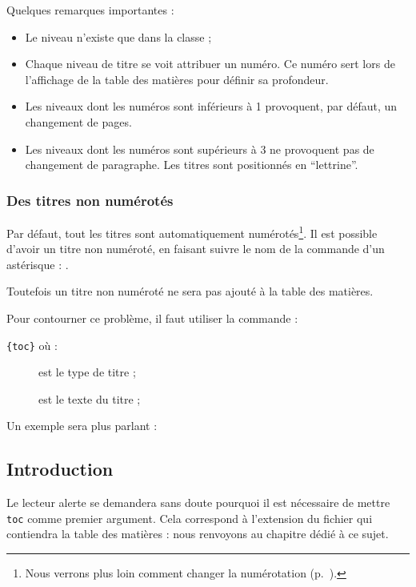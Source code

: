 Quelques remarques importantes :
\begin{itemize}
\item Le niveau  n'existe que dans la classe  ;
\item Chaque niveau de titre se voit attribuer un numéro. Ce numéro sert lors de l'affichage de la table des matières pour définir sa profondeur.\label{numeroniveau}
\item Les niveaux dont les numéros sont inférieurs à 1 provoquent, par défaut, un changement de pages.
\item Les niveaux dont les numéros sont supérieurs à 3 ne provoquent pas de changement de paragraphe. Les titres sont positionnés en \enquote{lettrine}.
\end{itemize}

\subsection{Des titres non numérotés}\label{titresansnumero}
Par défaut, tout les titres sont automatiquement numérotés\footnote{Nous verrons plus loin comment changer la numérotation (p.~\pageref{apparencecompteur}).}. Il est possible d'avoir un titre non numéroté, en faisant suivre le nom de la commande d'un astérisque : .


Toutefois un titre non numéroté ne sera pas ajouté à la table des matières. 

Pour contourner ce problème, il faut utiliser la commande :

\verb|{toc}| où : \label{addcontentsline}

\begin{description}
    \item[] est le type de titre ;
    \item[] est le texte du titre ;
\end{description}

Un exemple sera plus parlant :


\begin{latexcode}
\chapter*{Introduction}
\end{latexcode}


\begin{plusloins}
Le lecteur alerte se demandera sans doute pourquoi il est nécessaire de mettre \verb|toc| comme premier argument. Cela correspond à l'extension du fichier qui contiendra la table des matières : nous renvoyons au chapitre dédié à ce sujet.
\end{plusloins}

